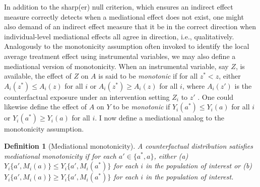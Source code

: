 \documentclass[12pt]{article}
\newtheorem{definition}{Definition}
\begin{document}
In addition to the sharp(er) null criterion, which ensures an indirect effect measure correctly detects when a mediational effect does not exist, one might also demand of an indirect effect measure that it be in the correct direction when individual-level mediational effects all agree in direction, i.e., qualitatively. Analogously to the monotonicity assumption often invoked to identify the local average treatment effect using instrumental variables, we may also define a mediational version of monotonicity. When an instrumental variable, say $Z$, is available, the effect of $Z$ on $A$ is said to be \emph{monotonic} if for all $z^*<z$, either $A_i(z^*)\leq A_i(z)$ for all $i$ or $A_i(z^*)\geq A_i(z)$ for all $i$, where $A_i(z')$ is the counterfactual exposure under an intervention setting $Z_i$ to $z'$ \citep{imbens1994identification}. One could likewise define the effect of $A$ on $Y$ to be \emph{monotonic} if $Y_i(a^*)\leq Y_i(a)$ for all $i$ or $Y_i(a^*)\geq Y_i(a)$ for all $i$. I now define a mediational analog to the monotonicity assumption.
\begin{definition}[Mediational monotonicity]
    A counterfactual distribution satisfies \emph{mediational monotonicity} if for each $a'\in\{a^*,a\}$, either (a) $Y_i\{a',M_i(a)\} \leq Y_i\{a',M_i(a^*)\}$ for each $i$ in the population of interest or (b) $Y_i\{a',\allowbreak M_i(a)\}\allowbreak \geq\allowbreak Y_i\{a',\allowbreak M_i(a^*)\}$ for each $i$ in the population of interest.
\end{definition}
\end{document}
